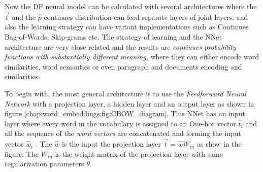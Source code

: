 Now the DF neural model can be calculated with several architectures where the $\vec{t}$ and the $\hat{p}$ continues distribution can feed separate layers of joint layers, and also the learning strategy can have variant implementations such as Continues Bag-of-Words, Skip-grams etc. The strategy of learning and the NNet architecture are very close related and the results are \textit{continues probability functions with substantially different meaning}, where they can either encode word similarities, word semantics or even paragraph and documents encoding and similarities. 

To begin with, the most general architecture is to use the \textit{Feedforward Neural Network} with a projection layer, a hidden layer and an output layer as shown in figure \ref{chap:word_embeddings:fig:CBOW_diagram}. This NNet has an input layer where every word in the vocabulary is assigned to an One-hot vector $\hat{t}_{i}$ and all the sequence of the \textit{word vectors} are concatenated and forming the input vector $\hat{w}_{i}$ . The $\hat{w}$ is the input the projection layer $\vec{t} = \hat{w}W_{in}$ as show in the figure. The $W_{in}$ is the weight matrix of the projection layer with same regularization parameters $\theta$.

